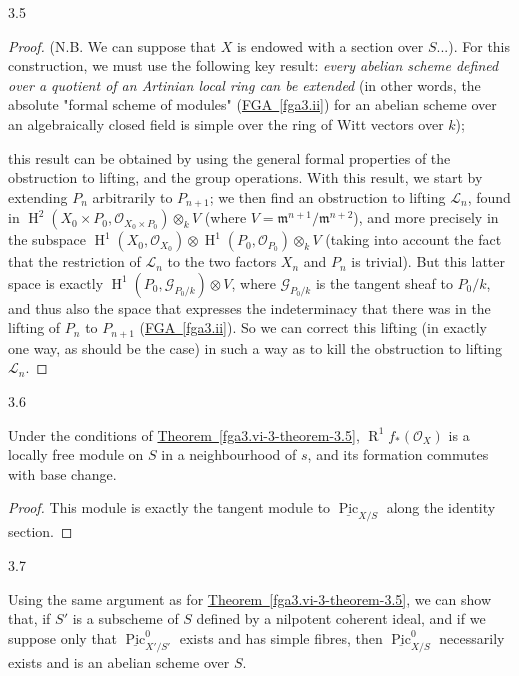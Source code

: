 \begin{theorem}{3.5}
\begin{proof}
      (N.B. We can suppose that \(X\) is endowed with a section over \(S\)...).
      For this construction, we must use the following key result: \emph{every abelian scheme defined over a quotient of an Artinian local ring can be extended} (in other words, the absolute "formal scheme of modules" (\hyperref[fga3.ii]{FGA~\ref*{fga3.ii}}) for an abelian scheme over an algebraically closed field is simple over the ring of Witt vectors over \(k\));
      
      this result can be obtained by using the general formal properties of the obstruction to lifting, and the group operations.
      With this result, we start by extending \(P_n\) arbitrarily to \(P_{n+1}\);
      we then find an obstruction to lifting \(\mathscr {L}_n\), found in \(\operatorname {H}^2(X_0\times  P_0,\mathcal {O}_{X_0\times  P_0})\otimes _k V\) (where \(V=\mathfrak {m}^{n+1}/\mathfrak {m}^{n+2}\)), and more precisely in the subspace \(\operatorname {H}^1(X_0,\mathcal {O}_{X_0})\otimes \operatorname {H}^1(P_0,\mathcal {O}_{P_0})\otimes _k V\) (taking into account the fact that the restriction of \(\mathscr {L}_n\) to the two factors \(X_n\) and \(P_n\) is trivial).
      But this latter space is exactly \(\operatorname {H}^1(P_0,\mathscr {G}_{P_0/k})\otimes  V\), where \(\mathscr {G}_{P_0/k}\) is the tangent sheaf to \(P_0/k\), and thus also the space that expresses the indeterminacy that there was in the lifting of \(P_n\) to \(P_{n+1}\) (\hyperref[fga3.ii]{FGA~\ref*{fga3.ii}}).
      So we can correct this lifting (in exactly one way, as should be the case) in such a way as to kill the obstruction to lifting \(\mathscr {L}_n\).\end{proof}\end{theorem}\begin{corollary}{3.6}\label{fga3.vi-3-corollary-3.6}\skipsinglepar\par{}Under the conditions of \hyperref[fga3.vi-3-theorem-3.5]{Theorem~\ref*{fga3.vi-3-theorem-3.5}}, \(\operatorname {R}^1 f_*(\mathcal {O}_X)\) is a locally free module on \(S\) in a neighbourhood of \(s\), and its formation commutes with base change.\begin{proof}\par{}This module is exactly the tangent module to \(\underline {\operatorname {Pic}}_{X/S}\) along the identity section.\end{proof}\end{corollary}\begin{remark}{3.7}\label{fga3.vi-3-remark-3.7}\skipsinglepar\par{}Using the same argument as for \hyperref[fga3.vi-3-theorem-3.5]{Theorem~\ref*{fga3.vi-3-theorem-3.5}}, we can show that, if \(S'\) is a subscheme of \(S\) defined by a nilpotent coherent ideal, and if we suppose only that \(\underline {\operatorname {Pic}}_{X'/S'}^0\) exists and has simple fibres, then \(\underline {\operatorname {Pic}}_{X/S}^0\) necessarily exists and is an abelian scheme over \(S\).

\end{remark}
